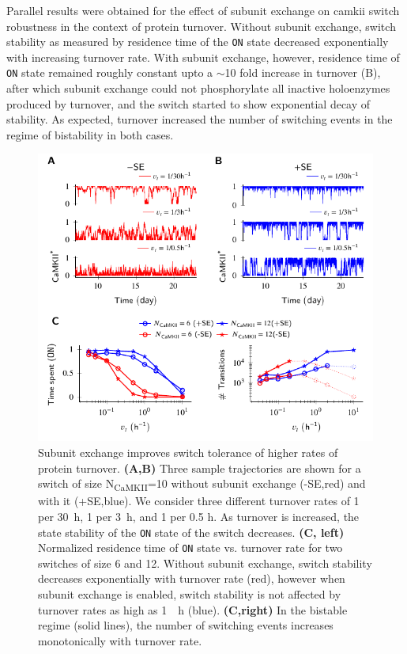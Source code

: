 \documentclass[9pt,lineno]{elife}
\newcommand\SUB[2]{#1\textsubscript{#2}}
\begin{document}
Parallel results were obtained for the effect of subunit exchange on
\gls{camkii} switch robustness in the context of protein turnover. Without
subunit exchange, switch stability as measured by residence time of the
\texttt{ON} state decreased exponentially with increasing turnover rate. With
subunit exchange, however, residence time of \texttt{ON} state remained roughly
constant upto a $\sim$10 fold increase in turnover (B), after
which subunit exchange could not phosphorylate all inactive holoenzymes produced
by turnover, and the switch started to show exponential decay of stability. As
expected, turnover increased the number of switching events in the regime of
bistability in both cases.

\begin{figure}[th!]
    \includegraphics[width=114mm]{./PaperFigures/elifeFigure3/figure_turnover_tolerance_114.pdf}
    \caption{Subunit exchange improves switch tolerance of higher rates of
        protein turnover.
        \textbf{(A,B)} Three sample trajectories are shown for a switch of 
        size \SUB{N}{CaMKII}=10 without subunit exchange
        (-SE,red) and with it (+SE,blue). We consider three different 
        turnover rates of 1 per \SI{30}{\hour}, 1 per \SI{3}{\hour}, 
        and 1 per 0.5 \si{\hour}. As turnover is increased, the state stability 
        of the \texttt{ON} state of the switch decreases.
        \textbf{(C, left)} Normalized residence time of \texttt{ON} state vs. turnover
        rate for two switches of size 6 and 12. Without subunit exchange, switch
        stability decreases exponentially with turnover rate (red), however when
        subunit exchange is enabled, switch stability is not affected by
        turnover rates as high as \SI{1}{\per \hour} (blue). \textbf{(C,right)} In
        the bistable regime (solid lines), the number of switching events
        increases monotonically with turnover rate.
    }\label{fig:turnover}
\end{figure}
\end{document}

